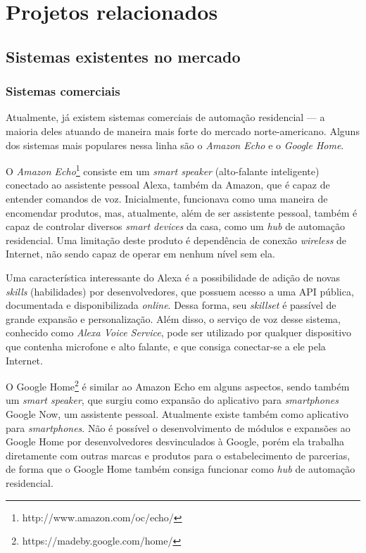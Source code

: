 \chapter{Projetos relacionados}

\section{Sistemas existentes no mercado}

\subsection{Sistemas comerciais}
Atualmente, já existem sistemas comerciais de automação residencial --- a maioria deles atuando de maneira mais forte do mercado norte-americano. Alguns dos sistemas mais populares nessa linha são o \emph{Amazon Echo} e o \emph{Google Home}.

O \emph{Amazon Echo}\footnote{http://www.amazon.com/oc/echo/} consiste em um \textit{smart speaker} (alto-falante inteligente) conectado ao assistente pessoal Alexa, também da Amazon, que é capaz de entender comandos de voz. Inicialmente, funcionava como uma maneira de encomendar produtos, mas, atualmente, além de ser assistente pessoal, também é capaz de controlar diversos \textit{smart devices} da casa, como um \textit{hub} de automação residencial. Uma limitação deste produto é dependência de conexão \textit{wireless} de Internet, não sendo capaz de operar em nenhum nível sem ela.

Uma característica interessante do Alexa é a possibilidade de adição de novas \textit{skills} (habilidades) por desenvolvedores, que possuem acesso a uma API pública, documentada e disponibilizada \textit{online}. Dessa forma, seu \textit{skillset} é passível de grande expansão e personalização. Além disso, o serviço de voz desse sistema, conhecido como \emph{Alexa Voice Service}, pode ser utilizado por qualquer dispositivo que contenha microfone e alto falante, e que consiga conectar-se a ele pela Internet.

O Google Home\footnote{https://madeby.google.com/home/} é similar ao Amazon Echo em alguns aspectos, sendo também um \textit{smart speaker}, que surgiu como expansão do aplicativo para \textit{smartphones} Google Now, um assistente pessoal. Atualmente existe também como aplicativo para \textit{smartphones}. Não é possível o desenvolvimento de módulos e expansões ao Google Home por desenvolvedores desvinculados à Google, porém ela trabalha diretamente com outras marcas e produtos para o estabelecimento de parcerias, de forma que o Google Home também consiga funcionar como \textit{hub} de automação residencial.

